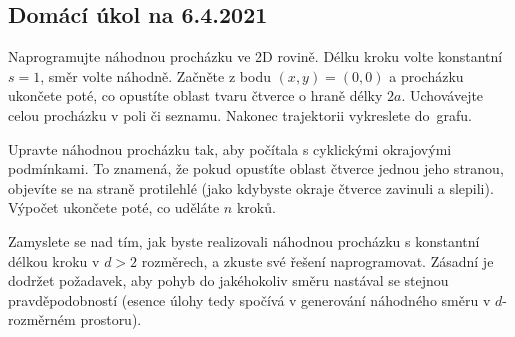 \documentclass[a4paper,11pt,twoside]{article}
\theoremstyle{red}
\theoremstyle{green}
\begin{document}
    \newpage
    {\color{red}\subsection*{Domácí úkol na 6.4.2021}}
    \begin{task}
        Naprogramujte náhodnou procházku ve 2D rovině.
        Délku kroku volte konstantní $s=1$, směr volte náhodně.
        Začněte z bodu $(x,y)=(0,0)$ a procházku ukončete poté, co opustíte oblast tvaru čtverce o hraně délky $2a$.
        Uchovávejte celou procházku v poli či seznamu.
        Nakonec trajektorii vykreslete do~grafu.
    \end{task}

    \begin{task}
        Upravte náhodnou procházku tak, aby počítala s cyklickými okrajovými podmínkami.
        To znamená, že pokud opustíte oblast čtverce jednou jeho stranou, objevíte se na straně protilehlé (jako kdybyste okraje čtverce zavinuli a slepili).
        Výpočet ukončete poté, co uděláte $n$ kroků.
    \end{task}

    \begin{task}\label{task:NahodnaProchazka}
        Zamyslete se nad tím, jak byste realizovali náhodnou procházku s konstantní délkou kroku v $d>2$ rozměrech, a zkuste své řešení naprogramovat.
        Zásadní je dodržet požadavek, aby pohyb do jakéhokoliv směru nastával se stejnou pravděpodobností (esence úlohy tedy spočívá v generování náhodného směru v $d$-rozměrném prostoru).
    \end{task}
\end{document}
